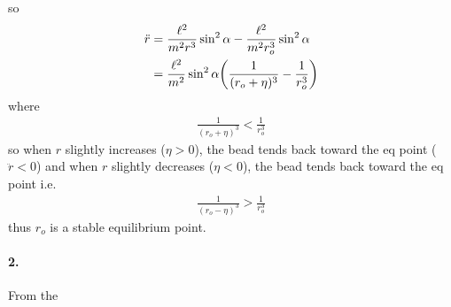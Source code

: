 \documentclass[../hw.tex]{subfiles}
\begin{document}
so
\begin{align*}
    \ddot r &= \frac{\ell^2}{m^2 r^3} \sin^2\alpha - \frac{\ell^2}{m^2 r_o^3} \sin^2\alpha \\
    &= \frac{\ell^2}{m^2} \sin^2\alpha \qt(\frac{1}{(r_o + \eta)^3} - \frac{1}{r_o^3})
\end{align*}
where
\begin{align*}
    \frac{1}{(r_o + \eta)^3} < \frac{1}{r_o^3}
\end{align*}
so when $r$ slightly increases ($\eta > 0$), the bead tends back toward the eq point ($\ddot r < 0$)
and when $r$ slightly decreases ($\eta < 0$), the bead tends back toward the eq point i.e.
\begin{align*}
    \frac{1}{(r_o - \eta)^3} > \frac{1}{r_o^3}
\end{align*}
thus $r_o$ is a stable equilibrium point.

\newpage 
\paragraph*{2.} From the 
\end{document}

